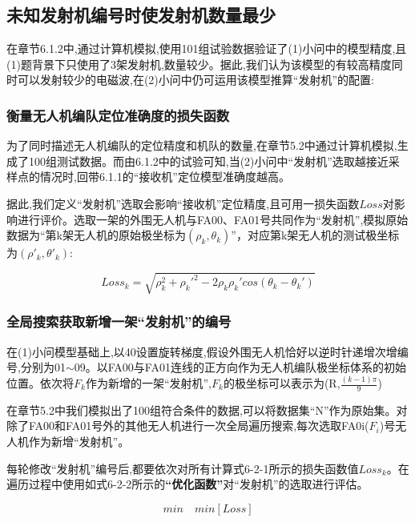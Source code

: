 \documentclass[withoutpreface,bwprint]{cumcmthesis} %
\begin{document}
		\subsection{未知发射机编号时使发射机数量最少}
			
			在章节6.1.2中,通过计算机模拟,使用101组试验数据验证了(1)小问中的模型精度,且(1)题背景下只使用了3架发射机,数量较少。据此,我们认为该模型的有较高精度同时可以发射较少的电磁波,在(2)小问中仍可运用该模型推算“发射机”的配置:
			
			\subsubsection{衡量无人机编队定位准确度的损失函数}
			
				为了同时描述无人机编队的定位精度和机队的数量,在章节5.2中通过计算机模拟,生成了100组测试数据。而由6.1.2中的试验可知,当(2)小问中“发射机”选取越接近采样点的情况时,回带6.1.1的“接收机”定位模型准确度越高。
			
				据此,我们定义“发射机”选取会影响“接收机”定位精度,且可用一损失函数$Loss$对影响进行评价。选取一架的外围无人机与FA00、FA01号共同作为“发射机”,模拟原始数据为“第k架无人机的原始极坐标为$(\rho_{k},\theta_{k})$”，对应第k架无人机的测试极坐标为$(\rho'_{k},\theta'_{k})$:
				
					\begin{equation}
						\tag{6-2-1}
						Loss_{k} = \sqrt{\rho_{k}^{2}+\rho_{k}'^{2}-2\rho_{k}\rho_{k}'cos(\theta_{k}-\theta_{k}')}
					\end{equation}
				
				\subsubsection{全局搜索获取新增一架“发射机”的编号}
				
				  在(1)小问模型基础上,以40\textdegree 设置旋转梯度,假设外围无人机恰好以逆时针递增次增编号,分别为01$\sim$09。以FA00与FA01连线的正方向作为无人机编队极坐标体系的初始位置。依次将$F_{k}$作为新增的一架“发射机”,$F_{k}$的极坐标可以表示为(R,$\frac{(k-1)\pi}{9}$)
					
					在章节5.2中我们模拟出了100组符合条件的数据,可以将数据集“N”作为原始集。对除了FA00和FA01号外的其他无人机进行一次全局遍历搜索,每次选取FA0i($F_{i}$)号无人机作为新增“发射机”。
						
					每轮修改“发射机”编号后,都要依次对所有计算式6-2-1所示的损失函数值$Loss_{k}$。在遍历过程中使用如式6-2-2所示的\textbf{“优化函数”}对“发射机”的选取进行评估。
				
					\begin{equation}
							\tag{6-2-2}
								min\quad min[Loss]  
							\end{equation}
						
\end{document}
